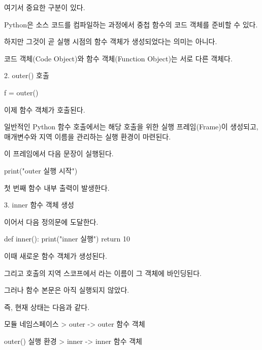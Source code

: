 여기서 중요한 구분이 있다.

Python은 소스 코드를 컴파일하는 과정에서 중첩 함수의 코드 객체를 준비할 수 있다.

하지만 그것이 곧 실행 시점의  함수 객체가 생성되었다는 의미는 아니다.

코드 객체(Code Object)와 함수 객체(Function Object)는 서로 다른 객체다.

\begin{dhknote}
\begin{dhksmry}[centered]
2. outer() 호출
\end{dhksmry}
\end{dhknote}

\begin{dhkcode}
f = outer()
\end{dhkcode}

이제  함수 객체가 호출된다.

일반적인 Python 함수 호출에서는 해당 호출을 위한 실행 프레임(Frame)이 생성되고, 매개변수와 지역 이름을 관리하는 실행 환경이 마련된다.

이 프레임에서 다음 문장이 실행된다.

\begin{dhkcode}
print("outer 실행 시작")
\end{dhkcode}

첫 번째 함수 내부 출력이 발생한다.

\begin{dhknote}
\begin{dhksmry}[centered]
3. inner 함수 객체 생성
\end{dhksmry}
\end{dhknote}

이어서 다음 정의문에 도달한다.

\begin{dhkcode}
def inner():
    print("inner 실행")
    return 10
\end{dhkcode}

이때 새로운 함수 객체가 생성된다.

그리고  호출의 지역 스코프에서 라는 이름이 그 객체에 바인딩된다.

그러나  함수 본문은 아직 실행되지 않았다.

즉, 현재 상태는 다음과 같다.

\begin{dhkdir}[in=6]
모듈 네임스페이스
> outer -> outer 함수 객체
\end{dhkdir}

\begin{dhkdir}[in=6]
outer() 실행 환경
> inner -> inner 함수 객체
\end{dhkdir}

